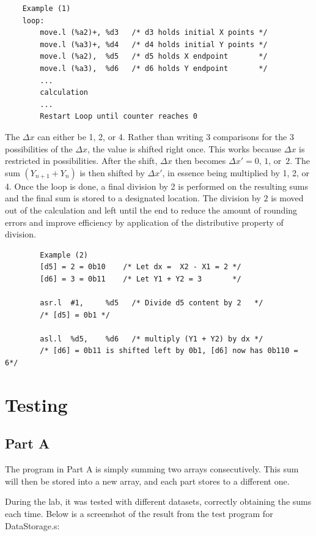 \documentclass[12pt]{article}
\begin{document}
    \begin{verbatim}
    Example (1)
    loop:
        move.l (%a2)+, %d3   /* d3 holds initial X points */
        move.l (%a3)+, %d4   /* d4 holds initial Y points */
        move.l (%a2),  %d5   /* d5 holds X endpoint       */
        move.l (%a3),  %d6   /* d6 holds Y endpoint       */
        ...
        calculation
        ...
        Restart Loop until counter reaches 0
    \end{verbatim}
    
   The $\Delta x$ can either be 1, 2, or 4. Rather than writing 3 comparisons for the 3 possibilities of the $\Delta x$, the value is shifted right once. This works because $\Delta x$ is restricted in possibilities. After the shift, $\Delta x$ then becomes $\Delta x' = 0,\,1,\,\text{or }\,2$. The sum $(Y_{n+1} + Y_n)$ is then shifted by $\Delta x'$, in essence being multiplied by 1, 2, or 4. Once the loop is done, a final division by 2 is performed on the resulting sums and the final sum is stored to a designated location. The division by $2$ is moved out of the calculation and left until the end to reduce the amount of rounding errors and improve efficiency by application of the distributive property of division.
    
        \begin{verbatim}
        Example (2)
        [d5] = 2 = 0b10    /* Let dx =  X2 - X1 = 2 */
        [d6] = 3 = 0b11    /* Let Y1 + Y2 = 3       */
        
        asr.l  #1,     %d5   /* Divide d5 content by 2   */
        /* [d5] = 0b1 */
        
        asl.l  %d5,    %d6   /* multiply (Y1 + Y2) by dx */
        /* [d6] = 0b11 is shifted left by 0b1, [d6] now has 0b110 = 6*/
        \end{verbatim}

\section{Testing}
\subsection{Part A}

The program in Part A is simply summing two arrays consecutively. This sum will then be stored into a new array, and each part stores to a different one.

During the lab, it was tested with different datasets, correctly obtaining the sums each time. Below is a screenshot of the result from the test program for DataStorage.s:
\end{document}
